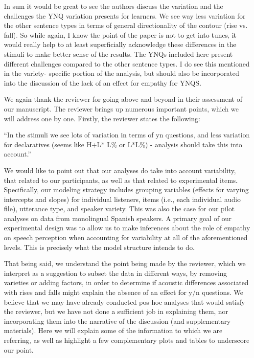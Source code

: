 \documentclass[]{article}
\begin{document}
{In sum it would be great to see the authors discuss the variation and the challenges the YNQ variation presents for learners. We see way less variation for the other sentence types in terms of general directionality of the contour (rise vs. fall). So while again, I know the point of the paper is not to get into tunes, it would really help to at least superficially acknowledge these differences in the stimuli to make better sense of the results. The YNQs included here present different challenges compared to the other sentence types. I do see this mentioned in the variety- specific portion of the analysis, but should also be incorporated into the discussion of the lack of an effect for empathy for YNQS.
}

We again thank the reviewer for going above and beyond in their assessment of our manuscript.
The reviewer brings up numerous important points, which we will address one by one.
Firstly, the reviewer states the following:

``In the stimuli we see lots of variation in terms of yn questions, and less variation for declaratives (seems like H+L* L\% or L*L\%) - analysis should take this into account.''

We would like to point out that our analyses do take into account variability, that related to our participants, as well as that related to experimental items.
Specifically, our modeling strategy includes grouping variables (effects for varying intercepts and slopes) for individual listeners, items (i.e., each individual audio file), utterance type, and speaker variety.
This was also the case for our pilot analyses on data from monolingual Spanish speakers.
A primary goal of our experimental design was to allow us to make inferences about the role of empathy on speech perception when accounting for variability at all of the aforementioned levels.
This is precisely what the model structure intends to do.

That being said, we understand the point being made by the reviewer, which we interpret as a suggestion to subset the data in different ways, by removing varieties or adding factors, in order to determine if acoustic differences associated with rises and falls might explain the absence of an effect for y/n questions.
We believe that we may have already conducted pos-hoc analyses that would satisfy the reviewer, but we have not done a sufficient job in explaining them, nor incorporating them into the narrative of the discussion (and supplementary materials).
Here we will explain some of the information to which we are referring, as well as highlight a few complementary plots and tables to underscore our point.
\end{document}
